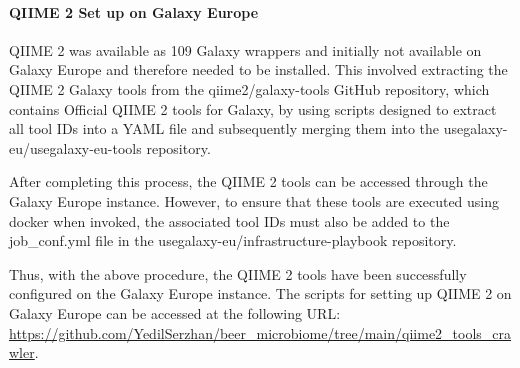         \paragraph*{QIIME 2 Set up on Galaxy Europe}
            QIIME 2 was available as 109 Galaxy wrappers and initially not available on Galaxy Europe and therefore needed to be installed. This involved extracting the QIIME 2 Galaxy tools from the qiime2/galaxy-tools GitHub repository, which contains Official QIIME 2 tools for Galaxy, by using scripts designed to extract all tool IDs into a YAML file and subsequently merging them into the usegalaxy-eu/usegalaxy-eu-tools repository.
        
        After completing this process, the QIIME 2 tools can be accessed through the Galaxy Europe instance. However, to ensure that these tools are executed using docker when invoked, the associated tool IDs must also be added to the job\_conf.yml file in the usegalaxy-eu/infrastructure-playbook repository.
        
        Thus, with the above procedure, the QIIME 2 tools have been successfully configured on the Galaxy Europe instance. The scripts for setting up QIIME 2 on Galaxy Europe can be accessed at the following URL: \url{https://github.com/YedilSerzhan/beer_microbiome/tree/main/qiime2_tools_crawler}.

